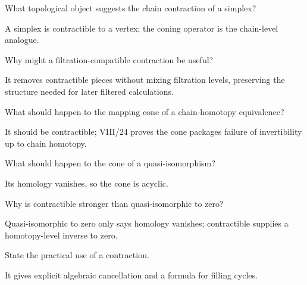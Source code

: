 \begin{problem}\label{prob:viii23-19}
What topological object suggests the chain contraction of a simplex?
\end{problem}
\begin{solution}
A simplex is contractible to a vertex; the coning operator is the chain-level analogue.
\end{solution}

\begin{problem}[Filtration]\label{prob:viii23-20}
Why might a filtration-compatible contraction be useful?
\end{problem}
\begin{solution}
It removes contractible pieces without mixing filtration levels, preserving the structure needed for later filtered calculations.
\end{solution}

\begin{problem}\label{prob:viii23-21}
What should happen to the mapping cone of a chain-homotopy equivalence?
\end{problem}
\begin{solution}
It should be contractible; VIII/24 proves the cone packages failure of invertibility up to chain homotopy.
\end{solution}

\begin{problem}\label{prob:viii23-22}
What should happen to the cone of a quasi-isomorphism?
\end{problem}
\begin{solution}
Its homology vanishes, so the cone is acyclic.
\end{solution}

\begin{problem}\label{prob:viii23-23}
Why is contractible stronger than quasi-isomorphic to zero?
\end{problem}
\begin{solution}
Quasi-isomorphic to zero only says homology vanishes; contractible supplies a homotopy-level inverse to zero.
\end{solution}

\begin{problem}\label{prob:viii23-24}
State the practical use of a contraction.
\end{problem}
\begin{solution}
It gives explicit algebraic cancellation and a formula for filling cycles.
\end{solution}
